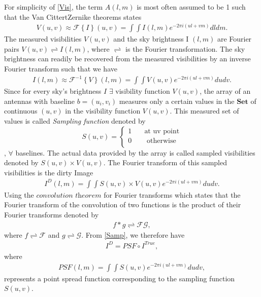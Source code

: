 For simplicity of \ref{Vis}, the term $A(l,m)$ is most often assumed to be 1 such that the Van CittertZernike theorems states
\begin{align}
V(u,v)\approx \mathcal{F}\left\{I\right\}(u,v)=\int \int I (l,m)e^{-2\pi i(ul+vm)} dl dm.
\label{V}
\end{align}
The measured visibilities $V(u,v)$ and the sky brightness I $(l,m)$ are Fourier pairs $V(u,v) \rightleftharpoons I(l,m)$, where $\rightleftharpoons$ is the Fourier transformation. The sky
brightness can readily be recovered from the measured visibilities by an inverse Fourier transform such that we have 
\begin{align}
I(l,m)\approx \mathcal{F}^{-1}\left\{V\right\}(l,m)=\int \int V (u,v)e^{-2\pi i(ul+vm)} du dv.
\end{align}
Since for every sky's brightness $I$ $\exists$ visibility function $V(u,v)$, the array of an antennas with baseline $b=(u_i,v_i)$  measures only a certain values in the $\textbf{Set}$ of continuous  $(u,v)$ in the visibility function $V(u,v)$. This measured set of values is called \emph{Sampling function} denoted by \citep{taylor1999synthesis} \[ S(u,v) =
  \begin{cases}
    1   & \quad    \text{at uv point}\\
    0  & \quad  \text{ otherwise}\\
  \end{cases}
\], $\forall$ baselines. The actual data provided by the array is called  sampled visibilities denoted by  $S(u,v)\times V(u,v)$. The Fourier transform of this sampled visibilities is the dirty Image
\begin{align}
I^{D}(l,m)=\int \int S(u,v)\times V(u,v) e^{-2\pi i(ul+vm)} du dv.
\label{Samp}
\end{align} 
Using the $\textit{convolution theorem}$ for Fourier transforms which states that the Fourier transform of the convolution of two functions is the product of their Fourier transforms denoted by 
\begin{align}
f*g\rightleftharpoons \mathcal{F} \mathcal{G},
\end{align}
where $f\rightleftharpoons \mathcal{F}$ and $g\rightleftharpoons \mathcal{G}$.
From \ref{Samp}, we therefore have 
\begin{align}
I^{D}=PSF \circ I^{True},
\end{align}
where 
\begin{align}
PSF(l,m) = \int \int S(u,v)e^{-2\pi i(ul+vm)} du dv,
\end{align}
represents a point spread function  corresponding to the sampling function $S(u,v)$.


